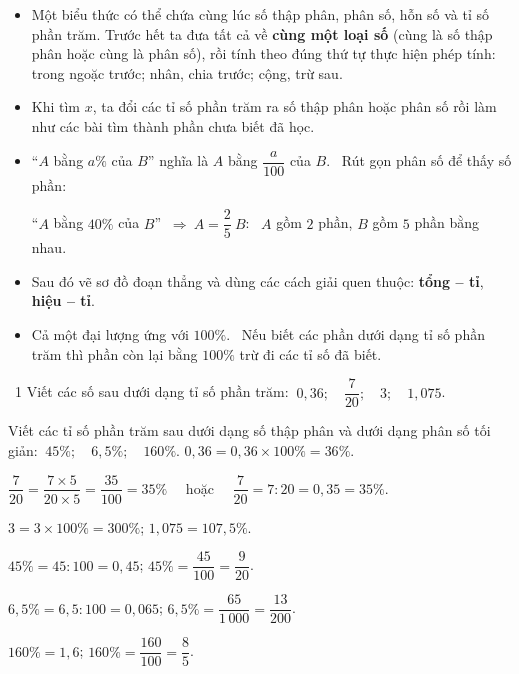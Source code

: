 \begin{knowbox}\begin{itemize}[leftmargin=1.4em,itemsep=3pt]
\item Một biểu thức có thể chứa cùng lúc số thập phân, phân số, hỗn số và tỉ số phần trăm. Trước hết ta đưa tất cả về \textbf{cùng một loại số} (cùng là số thập phân hoặc cùng là phân số), rồi tính theo đúng thứ tự thực hiện phép tính: trong ngoặc trước; nhân, chia trước; cộng, trừ sau.
\item Khi tìm $x$, ta đổi các tỉ số phần trăm ra số thập phân hoặc phân số rồi làm như các bài tìm thành phần chưa biết đã học.
\end{itemize}
\end{knowbox}
\gap
{}
\begin{knowbox}\begin{itemize}[leftmargin=1.4em,itemsep=3pt]
\item ``$A$ bằng $a\%$ của $B$'' nghĩa là $A$ bằng $\dfrac a{100}$ của $B$. \ Rút gọn phân số để thấy số phần:\par
``$A$ bằng $40\%$ của $B$'' $\ \Rightarrow\ A=\dfrac25\ B$: \ $A$ gồm $2$ phần, $B$ gồm $5$ phần bằng nhau.
\item Sau đó vẽ sơ đồ đoạn thẳng và dùng các cách giải quen thuộc: \textbf{tổng -- tỉ}, \textbf{hiệu -- tỉ}.
\item Cả một đại lượng ứng với $100\%$. \ Nếu biết các phần dưới dạng tỉ số phần trăm thì phần còn lại bằng $100\%$ trừ đi các tỉ số đã biết.
\end{itemize}
\end{knowbox}
\gap
\begin{exbox}{\ExWord\ 1}
 Viết các số sau dưới dạng tỉ số phần trăm: $\ 0{,}36;\quad \dfrac7{20};\quad 3;\quad 1{,}075$.\par
{} Viết các tỉ số phần trăm sau dưới dạng số thập phân và dưới dạng phân số tối giản: $\ 45\%;\quad 6{,}5\%;\quad 160\%$.
\guide
{} $0{,}36=0{,}36\times100\%=36\%$.\par
$\dfrac7{20}=\dfrac{7\times5}{20\times5}=\dfrac{35}{100}=35\%$ \ \ hoặc \ \ $\dfrac7{20}=7:20=0{,}35=35\%$.\par
$3=3\times100\%=300\%$; \qquad $1{,}075=107{,}5\%$.\par
{} $45\%=45:100=0{,}45$; \quad $45\%=\dfrac{45}{100}=\dfrac9{20}$.\par
$6{,}5\%=6{,}5:100=0{,}065$; \quad $6{,}5\%=\dfrac{65}{1\,000}=\dfrac{13}{200}$.\par
$160\%=1{,}6$; \quad $160\%=\dfrac{160}{100}=\dfrac85$.
\end{exbox}
